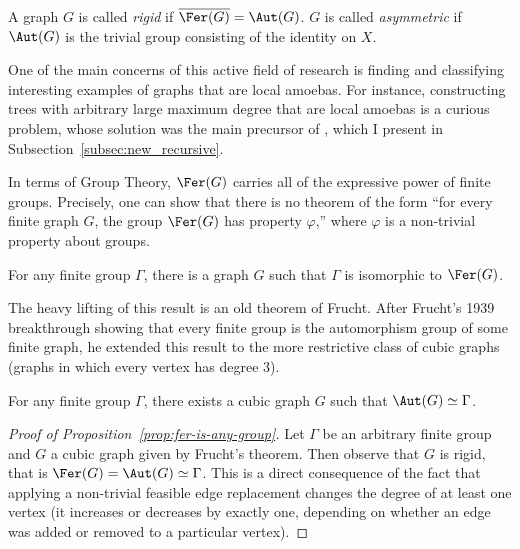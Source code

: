 \begin{definition}
    A graph $G$ is called \emph{rigid} if $\overline{\Fer(G)}=\Aut(G)$.
    $G$ is called \emph{asymmetric} if $\Aut(G)$ is the trivial group consisting of the identity on $X$.
\end{definition}

One of the main concerns of this active field of research is finding and classifying interesting examples of graphs that are local amoebas.
For instance, constructing trees with arbitrary large maximum degree that are local amoebas is a curious problem, whose solution was the main precursor of \cite{Eslavaetal2025}, which I present in Subsection~\ref{subsec:new_recursive}.

In terms of Group Theory, $\Fer(G)$ carries all of the expressive power of finite groups.
Precisely, one can show that there is no theorem of the form ``for every finite graph $G$, the group $\Fer(G)$ has property $\varphi$,'' where $\varphi$ is a non-trivial property about groups.

\begin{proposition}\label{prop:fer-is-any-group}
    For any finite group $\Gamma$, there is a graph $G$ such that $\Gamma$ is isomorphic to $\Fer(G)$.
\end{proposition}

The heavy lifting of this result is an old theorem of Frucht.
After Frucht's 1939 breakthrough showing that every finite group is the automorphism group of some finite graph, he extended this result to the more restrictive class of cubic graphs (graphs in which every vertex has degree 3).

\begin{lemma}
    For any finite group $\Gamma$, there exists a cubic graph $G$ such that $\Aut(G)\simeq\Gamma$.
\end{lemma}

\begin{proof}[Proof of Proposition~\ref{prop:fer-is-any-group}]
    Let $\Gamma$ be an arbitrary finite group and $G$ a cubic graph given by Frucht's theorem.
    Then observe that $G$ is rigid, that is $\Fer(G)=\Aut(G)\simeq\Gamma$.
    This is a direct consequence of the fact that applying a non-trivial feasible edge replacement changes the degree of at least one vertex (it increases or decreases by exactly one, depending on whether an edge was added or removed to a particular vertex).
\end{proof}

